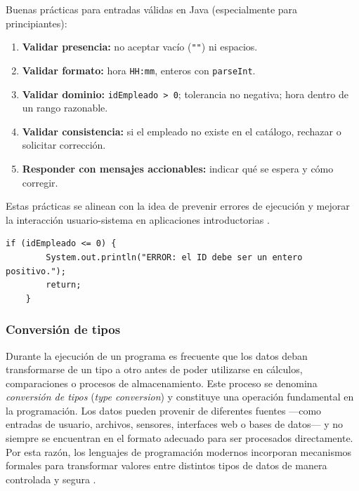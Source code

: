 \documentclass[12pt,twoside]{book}
\begin{document}
						Buenas prácticas para entradas válidas en Java (especialmente para principiantes):
						\begin{enumerate}
							\item \textbf{Validar presencia:} no aceptar vacío (\texttt{""}) ni espacios.
							\item \textbf{Validar formato:} hora \texttt{HH:mm}, enteros con \texttt{parseInt}.
							\item \textbf{Validar dominio:} \texttt{idEmpleado > 0}; tolerancia no negativa; hora dentro de un rango razonable.
							\item \textbf{Validar consistencia:} si el empleado no existe en el catálogo, rechazar o solicitar corrección.
							\item \textbf{Responder con mensajes accionables:} indicar qué se espera y cómo corregir.
						\end{enumerate}
						
						\noindent
						Estas prácticas se alinean con la idea de prevenir errores de ejecución y mejorar la interacción usuario-sistema en aplicaciones introductorias \cite{Gaddis2022Starting,Farrell2018Programming,Pressman2019Software}.
						
						\begin{lstlisting}[style=Java,caption={Validación simple de dominio para idEmpleado.},label={lst:ValidacionDominioId}]
	if (idEmpleado <= 0) {
		System.out.println("ERROR: el ID debe ser un entero positivo.");
		return;
	} \end{lstlisting}
						
					\subsubsection{Conversión de tipos}
						\noindent
						Durante la ejecución de un programa es frecuente que los datos deban transformarse de un tipo a otro antes de poder utilizarse en cálculos, comparaciones o procesos de almacenamiento. Este proceso se denomina \textit{conversión de tipos} (\textit{type conversion}) y constituye una operación fundamental en la programación. Los datos pueden provenir de diferentes fuentes —como entradas de usuario, archivos, sensores, interfaces web o bases de datos— y no siempre se encuentran en el formato adecuado para ser procesados directamente. Por esta razón, los lenguajes de programación modernos incorporan mecanismos formales para transformar valores entre distintos tipos de datos de manera controlada y segura \cite{Gosling2014JavaLanguageSpec,Deitel2025Java}.
						
\end{document}
